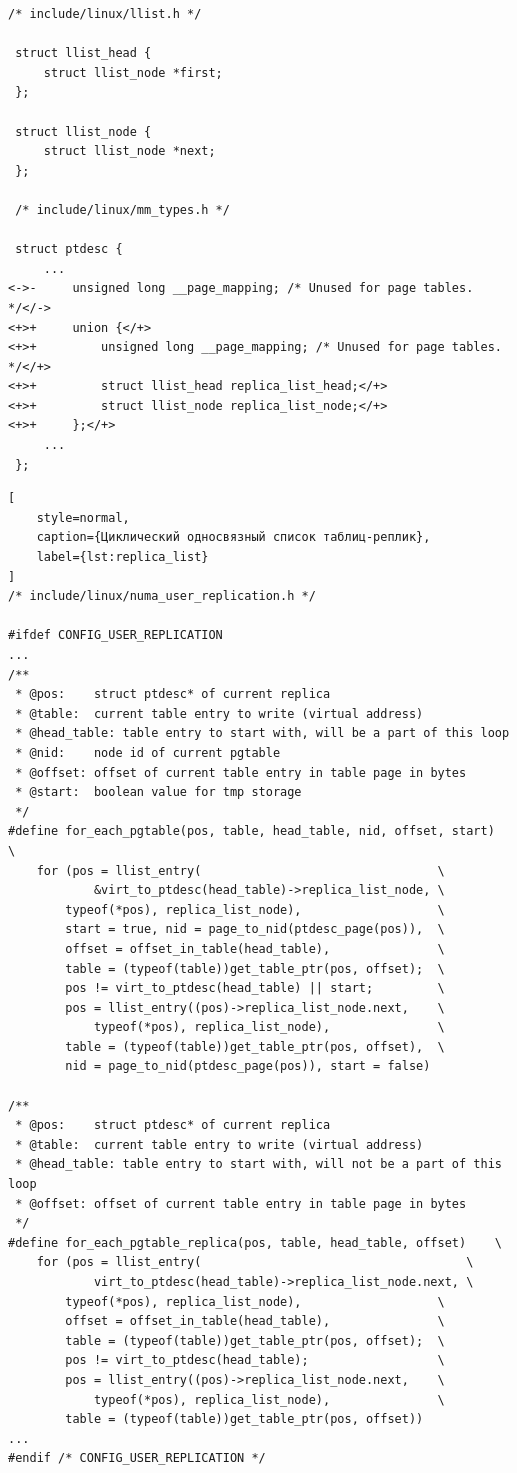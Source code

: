 \begin{lstlisting}[style=diff]
 /* include/linux/llist.h */

 struct llist_head {
	 struct llist_node *first;
 };
 
 struct llist_node {
	 struct llist_node *next;
 };

 /* include/linux/mm_types.h */

 struct ptdesc {
	 ...
<->-	 unsigned long __page_mapping; /* Unused for page tables. */</->
<+>+	 union {</+>
<+>+		 unsigned long __page_mapping; /* Unused for page tables. */</+>
<+>+		 struct llist_head replica_list_head;</+>
<+>+		 struct llist_node replica_list_node;</+>
<+>+	 };</+>
	 ...
 };
\end{lstlisting}
\begin{lstlisting}[
	style=normal,
	caption={Циклический односвязный список таблиц-реплик},
	label={lst:replica_list}
]
/* include/linux/numa_user_replication.h */

#ifdef CONFIG_USER_REPLICATION
...
/**
 * @pos:	struct ptdesc* of current replica
 * @table:	current table entry to write (virtual address)
 * @head_table:	table entry to start with, will be a part of this loop
 * @nid:	node id of current pgtable
 * @offset:	offset of current table entry in table page in bytes
 * @start:	boolean value for tmp storage
 */
#define for_each_pgtable(pos, table, head_table, nid, offset, start)	\
	for (pos = llist_entry(									\
			&virt_to_ptdesc(head_table)->replica_list_node,	\
		typeof(*pos), replica_list_node),					\
	    start = true, nid = page_to_nid(ptdesc_page(pos)),	\
	    offset = offset_in_table(head_table),				\
		table = (typeof(table))get_table_ptr(pos, offset);	\
	    pos != virt_to_ptdesc(head_table) || start;			\
	    pos = llist_entry((pos)->replica_list_node.next,	\
			typeof(*pos), replica_list_node),				\
	    table = (typeof(table))get_table_ptr(pos, offset),	\
	    nid = page_to_nid(ptdesc_page(pos)), start = false)

/**
 * @pos:	struct ptdesc* of current replica
 * @table:	current table entry to write (virtual address)
 * @head_table:	table entry to start with, will not be a part of this loop
 * @offset:	offset of current table entry in table page in bytes
 */
#define for_each_pgtable_replica(pos, table, head_table, offset)	\
	for (pos = llist_entry(										\
			virt_to_ptdesc(head_table)->replica_list_node.next,	\
		typeof(*pos), replica_list_node),					\
	    offset = offset_in_table(head_table),				\
		table = (typeof(table))get_table_ptr(pos, offset);	\
	    pos != virt_to_ptdesc(head_table);					\
	    pos = llist_entry((pos)->replica_list_node.next,	\
			typeof(*pos), replica_list_node),				\
	    table = (typeof(table))get_table_ptr(pos, offset))
...
#endif /* CONFIG_USER_REPLICATION */
\end{lstlisting}
\vspace{0.5cm}

